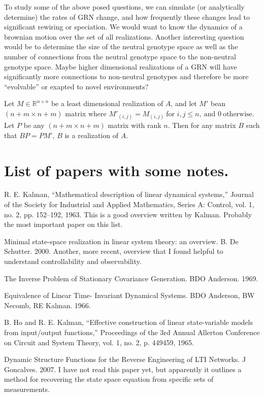 \documentclass[a4paper, 11 pt]{article}
\begin{document}
To study some of the above posed questions, we can simulate (or analytically determine) the rates of GRN change, and how frequently these changes lead to significant rewiring or speciation. We would want to know the dynamics of a brownian motion over the set of all realizations.
Another interesting question would be to determine the size of the neutral genotype space as well as the number of connections from the neutral genotype space to the non-neutral genotype space. Maybe higher dimensional realizations of a GRN will have significantly more connections to non-neutral genotypes and therefore be more ``evolvable'' or exapted to novel environments? 

Let $M \in \mathbb{R}^{n \times n}$ be a least dimensional realization of $A$, and let $M'$ bean $(n+m \times n+m)$ matrix where $M'_{(i,j)} = M_{(i,j)} \ \text{for } i,j \leq n, \ \text{and } 0 \ \text{otherwise}$. Let $P$ be any $(n+m \times n+m)$ matrix with rank $n$. Then for any matrix $B$ such that $BP = PM'$, $B$ is a realization of $A$.     

\section{List of papers with some notes.}

R. E. Kalman, “Mathematical description of linear dynamical systems,” Journal of the Society for Industrial and Applied Mathematics, Series A: Control, vol. 1, no. 2, pp. 152–192, 1963.
This is a good overview written by Kalman. Probably the most important paper on this list.

Minimal state-space realization in linear system theory: an overview. B. De Schutter. 2000.
Another, more recent, overview that I found helpful to understand controllability and observability. 

The Inverse Problem of Stationary Covariance Generation. BDO Anderson. 1969.

Equivalence of Linear Time- Invariant Dynamical Systems. BDO Anderson, BW Necomb, RE Kalman. 1966. 

B. Ho and R. E. Kalman, “Effective construction of linear state-variable models from input/output functions,” Proceedings of the 3rd Annual Allerton Conference on Circuit and System Theory, vol. 1, no. 2, p. 449459, 1965.

Dynamic Structure Functions for the Reverse Engineering of LTI Networks. J Goncalves. 2007.
I have not read this paper yet, but apparently it outlines a method for recovering the state space equation from specific sets of measurements.
\end{document}
